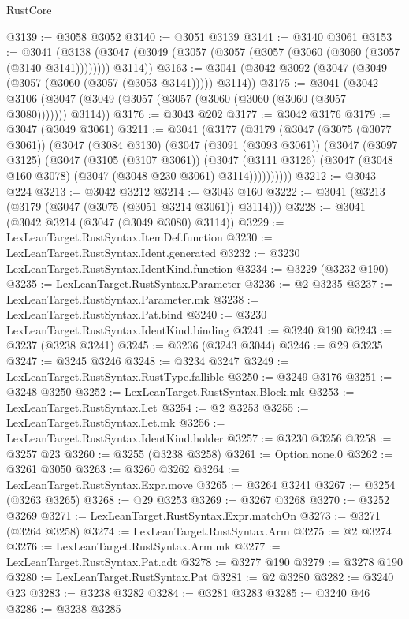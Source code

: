 \begin{lexlean}{RustCore}
\begin{coremodule}
@3139 := @3058 @3052
@3140 := @3051 @3139
@3141 := @3140 @3061
@3153 := @3041
    (@3138 (@3047 (@3049 (@3057 (@3057 (@3057 (@3060 (@3060 (@3057 (@3140 @3141)))))))) @3114))
@3163 := @3041 (@3042 @3092 (@3047 (@3049 (@3057 (@3060 (@3057 (@3053 @3141))))) @3114))
@3175 := @3041
    (@3042 @3106 (@3047 (@3049 (@3057 (@3057 (@3060 (@3060 (@3060 (@3057 @3080))))))) @3114))
@3176 := @3043 @202
@3177 := @3042 @3176
@3179 := @3047 (@3049 @3061)
@3211 := @3041
    (@3177
      (@3179
        (@3047
          (@3075 (@3077 @3061))
          (@3047
            (@3084 @3130)
            (@3047
              (@3091 (@3093 @3061))
              (@3047
                (@3097 @3125)
                (@3047
                  (@3105 (@3107 @3061))
                  (@3047
                    (@3111 @3126)
                    (@3047 (@3048 @160 @3078) (@3047 (@3048 @230 @3061) @3114))))))))))
@3212 := @3043 @224
@3213 := @3042 @3212
@3214 := @3043 @160
@3222 := @3041 (@3213 (@3179 (@3047 (@3075 (@3051 @3214 @3061)) @3114)))
@3228 := @3041 (@3042 @3214 (@3047 (@3049 @3080) @3114))
@3229 := LexLeanTarget.RustSyntax.ItemDef.function
@3230 := LexLeanTarget.RustSyntax.Ident.generated
@3232 := @3230 LexLeanTarget.RustSyntax.IdentKind.function
@3234 := @3229 (@3232 @190)
@3235 := LexLeanTarget.RustSyntax.Parameter
@3236 := @2 @3235
@3237 := LexLeanTarget.RustSyntax.Parameter.mk
@3238 := LexLeanTarget.RustSyntax.Pat.bind
@3240 := @3230 LexLeanTarget.RustSyntax.IdentKind.binding
@3241 := @3240 @190
@3243 := @3237 (@3238 @3241)
@3245 := @3236 (@3243 @3044)
@3246 := @29 @3235
@3247 := @3245 @3246
@3248 := @3234 @3247
@3249 := LexLeanTarget.RustSyntax.RustType.fallible
@3250 := @3249 @3176
@3251 := @3248 @3250
@3252 := LexLeanTarget.RustSyntax.Block.mk
@3253 := LexLeanTarget.RustSyntax.Let
@3254 := @2 @3253
@3255 := LexLeanTarget.RustSyntax.Let.mk
@3256 := LexLeanTarget.RustSyntax.IdentKind.holder
@3257 := @3230 @3256
@3258 := @3257 @23
@3260 := @3255 (@3238 @3258)
@3261 := Option.none.{0}
@3262 := @3261 @3050
@3263 := @3260 @3262
@3264 := LexLeanTarget.RustSyntax.Expr.move
@3265 := @3264 @3241
@3267 := @3254 (@3263 @3265)
@3268 := @29 @3253
@3269 := @3267 @3268
@3270 := @3252 @3269
@3271 := LexLeanTarget.RustSyntax.Expr.matchOn
@3273 := @3271 (@3264 @3258)
@3274 := LexLeanTarget.RustSyntax.Arm
@3275 := @2 @3274
@3276 := LexLeanTarget.RustSyntax.Arm.mk
@3277 := LexLeanTarget.RustSyntax.Pat.adt
@3278 := @3277 @190
@3279 := @3278 @190
@3280 := LexLeanTarget.RustSyntax.Pat
@3281 := @2 @3280
@3282 := @3240 @23
@3283 := @3238 @3282
@3284 := @3281 @3283
@3285 := @3240 @46
@3286 := @3238 @3285

\end{coremodule}
\end{lexlean}
